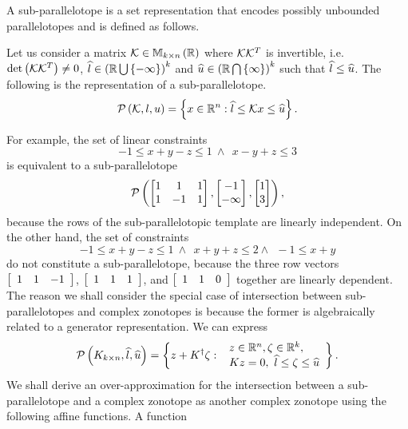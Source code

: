 A sub-parallelotope is a set representation that encodes possibly
unbounded parallelotopes and is defined as follows.
%
\begin{definition}
Let us consider a matrix $\mathcal{K}\in\mathbb{M}_{k\times n}\left(\mathbb{R}\right)$ where
$\mathcal{K}{\mathcal{K}}^T$ is invertible,
i.e. $\operatorname{det}\left(\mathcal{K}{\mathcal{K}}^T\right)\neq 0$,
$\widehat{l}\in\left(\mathbb{R}\bigcup\left\{-\infty\right\}\right)^k$ and
$\widehat{u}\in\left(\mathbb{R}\bigcap\left\{\infty\right\}\right)^k$ such that $\widehat{l}\leq\widehat{u}$.
The following is the representation of a sub-parallelotope.
%
\[
\mathcal{P}\left(\mathcal{K},l,u\right) = \left\{x\in\mathbb{R}^n: \widehat{l}\leq\mathcal{K} x\leq\widehat{u}\right\}.
\]
%
\end{definition}
%
For example, the set of linear constraints
%
\[ -1\leq x+y-z\leq
1~\wedge~~ x-y+z\leq 3\]
%
is equivalent to a sub-parallelotope
$$\mathcal{P}\left(\left[\begin{matrix}1 & 1 & 1\\1 &-1 & 1\end{matrix}\right],\left[\begin{matrix}-1\\-\infty\end{matrix}\right],\left[\begin{matrix}1\\3\end{matrix}\right]\right),$$
because the rows of the sub-parallelotopic template are linearly
independent.  On the other hand, the set of constraints
%
\[
-1\leq
x+y-z\leq 1~\wedge~~x+y+z\leq 2\wedge~~-1\leq x+y
\]
%
do not constitute a sub-parallelotope, because the three row vectors
$\left[\begin{array}{c c c}1 & 1 & -1\end{array}\right]$,
$\left[\begin{array}{c c c}1 & 1 & 1\end{array}\right]$, and
$\left[\begin{array}{c c c}1 & 1 & 0\end{array}\right]$ together are
linearly dependent.  The reason we shall consider the special case of
intersection between sub-parallelotopes and complex zonotopes is
because the former is algebraically related to a generator
representation.  We can express %
\[
\mathcal{P}\left(K_{k\times
    n},\widehat{l},\widehat{u}\right)=\left\{z+{K}^\dagger\zeta:\begin{array}{l}~z\in\mathbb{R}^n,\zeta\in\mathbb{R}^k,
  \\~Kz=0,~\widehat{l}\leq
\zeta\leq \widehat{u}\end{array}\right\}.
\]
%
We shall derive an over-approximation for the intersection
between a sub-parallelotope and a complex zonotope as another complex
zonotope using the following affine
functions.  A function
